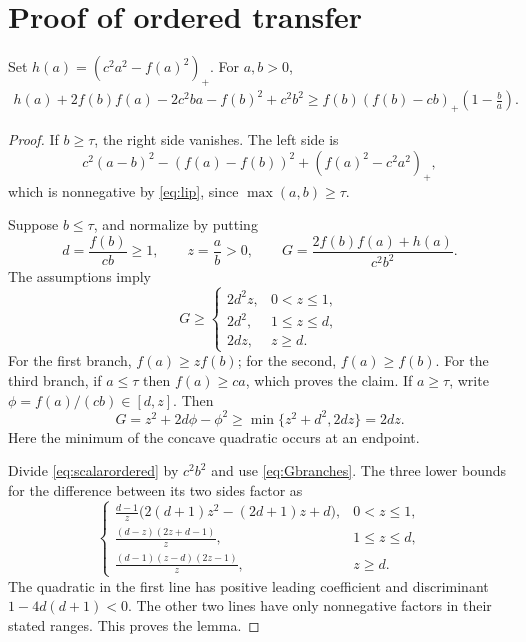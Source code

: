 \documentclass[11pt]{article}
\begin{document}
\section{Proof of ordered transfer}
\begin{lemma}\label{lem:orderedscalar}
Set $h(a)=(c^2a^2-f(a)^2)_+$. For $a,b>0$,
\begin{align}\label{eq:scalarordered}
 h(a)+2f(b)f(a)-2c^2ba-f(b)^2+c^2b^2
 \ge f(b)(f(b)-cb)_+\left(1-\frac ba\right).
\end{align}
\end{lemma}
\begin{proof}
If $b\ge\tau$, the right side vanishes. The left side is
\[
 c^2(a-b)^2-(f(a)-f(b))^2+(f(a)^2-c^2a^2)_+,
\]
which is nonnegative by \eqref{eq:lip}, since $\max(a,b)\ge\tau$.

Suppose $b\le\tau$, and normalize by putting
\[
 d=\frac{f(b)}{cb}\ge1,\qquad z=\frac ab>0,\qquad
 G=\frac{2f(b)f(a)+h(a)}{c^2b^2}.
\]
The assumptions imply
\begin{equation}\label{eq:Gbranches}
 G\ge\begin{cases}
 2d^2z,&0<z\le1,\\
 2d^2,&1\le z\le d,\\
 2dz,&z\ge d.
 \end{cases}
\end{equation}
For the first branch, $f(a)\ge zf(b)$; for the second, $f(a)\ge f(b)$. For the third branch, if $a\le\tau$ then $f(a)\ge ca$, which proves the claim. If $a\ge\tau$, write $\phi=f(a)/(cb)\in[d,z]$. Then
\[
 G=z^2+2d\phi-\phi^2\ge\min\{z^2+d^2,2dz\}=2dz.
\]
Here the minimum of the concave quadratic occurs at an endpoint.

Divide \eqref{eq:scalarordered} by $c^2b^2$ and use \eqref{eq:Gbranches}. The three lower bounds for the difference between its two sides factor as
\begin{equation}\label{eq:branchcertificates}
 \begin{cases}
 \displaystyle\frac{d-1}{z}
  \bigl(2(d+1)z^2-(2d+1)z+d\bigr),&0<z\le1,\\[5pt]
 \displaystyle\frac{(d-z)(2z+d-1)}{z},&1\le z\le d,\\[5pt]
 \displaystyle\frac{(d-1)(z-d)(2z-1)}{z},&z\ge d.
 \end{cases}
\end{equation}
The quadratic in the first line has positive leading coefficient and discriminant $1-4d(d+1)<0$. The other two lines have only nonnegative factors in their stated ranges. This proves the lemma.
\end{proof}
\end{document}
